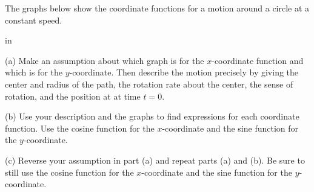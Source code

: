 \documentclass{ximera}
\newcommand{\pskip}{\vskip 0.1 in}
\begin{document}
\begin{example} \label{Ex3:Graphs}
The graphs below show the coordinate functions for a motion around a circle at a constant speed. 

\pskip


(a) Make an assumption about which graph is for the $x$-coordinate function and which is for the $y$-coordinate. Then describe the motion precisely by giving the center and radius of the path, the rotation rate about the center, the sense of rotation, and the position at at time $t=0$.

(b) Use your description and the graphs to find expressions for each coordinate function. Use the cosine function for the $x$-coordinate and the sine function for the $y$-coordinate.

(c) Reverse  your assumption in part (a) and repeat parts (a) and (b). Be sure to still use the cosine function for the $x$-coordinate and the sine function for the $y$-coordinate.


\begin{exploration}
 
\begin{onlineOnly}
    \begin{center}
\end{center}
\end{onlineOnly}
\end{exploration}

\end{example}
\end{document}
